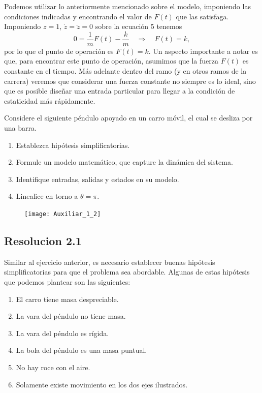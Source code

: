 \documentclass[
  11pt,
  letterpaper,
   addpoints,
   answers
  ]{exam}
\begin{document}
\begin{questions}
\begin{solution}
Podemos utilizar lo anteriormente mencionado sobre el modelo, imponiendo las condiciones indicadas y encontrando el valor de $F(t)$ que las satisfaga. Imponiendo $z = 1$, $\dot{z} = \ddot{z} = 0$ sobre la ecuación 5 tenemos
\begin{equation}
    0 = \frac{1}{m}F(t) - \frac{k}{m} \quad \Rightarrow \quad F(t) = k,
\end{equation}
por lo que el punto de operación es $F(t) = k$. Un aspecto importante a notar es que, para encontrar este punto de operación, asumimos que la fuerza $F(t)$ es constante en el tiempo. Más adelante dentro del ramo (y en otros ramos de la carrera) veremos que considerar una fuerza constante no siempre es lo ideal, sino que es posible diseñar una entrada particular para llegar a la condición de estaticidad más rápidamente.
    \end{solution}
    \question Considere el siguiente péndulo apoyado en un carro móvil, el cual se desliza por una barra.
    \begin{enumerate}
        \item Establezca hipótesis simplificatorias.
        \item Formule un modelo matemático, que capture la dinámica del sistema.
        \item Identifique entradas, salidas y estados en su modelo.
        \item Linealice en torno a $\theta = \pi$.
    \end{enumerate}
    \begin{figure}[h]
        \centering
        \texttt{[image: Auxiliar\_1\_2]}
    \end{figure}
\begin{solution}
\subsection*{Resolucion 2.1}
    Similar al ejercicio anterior, es necesario establecer buenas hipótesis simplificatorias para que el problema sea abordable. Algunas de estas hipótesis que podemos plantear son las siguientes:
\begin{enumerate}
    \item El carro tiene masa despreciable.
    \item La vara del péndulo no tiene masa.
    \item La vara del péndulo es rígida.
    \item La bola del péndulo es una masa puntual.
    \item No hay roce con el aire.
    \item Solamente existe movimiento en los dos ejes ilustrados.
\end{enumerate}

\end{solution}
\end{questions}
\end{document}
